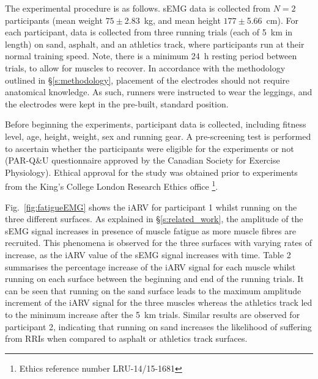 \documentclass[letterpaper, 10 pt, conference]{ieeeconf}
\newcommand{\fref}[1]{Fig.~\ref{#1}}       \newcommand{\sref}[1]{\S\ref{#1}}          \newcommand{\tref}[1]{\tablename~\ref{#1}} \newcommand{\eref}[1]{(\ref{#1})}
\begin{document}
The experimental procedure is as follows. sEMG data is collected from $N=2$
participants (mean weight $75\pm$\SI{2.83}{\kilo\gram}, and mean height
$177\pm$\SI{5.66}{\centi\meter}).  For each participant, data is collected from
three running trials (each of \SI{5}{\kilo\meter} in length) on sand, asphalt,
and an athletics track, where participants run at their normal training speed.
Note, there is a minimum \SI{24}{\hour} resting period between trials, to allow
for muscles to recover.  In accordance with the methodology outlined in
\sref{s:methodology}, placement of the electrodes should not require anatomical
knowledge. As such, runners were instructed to wear the leggings, and the
electrodes were kept in the pre-built, standard position. 

Before beginning the experiments, participant data is collected, including
fitness level, age, height, weight, sex and running gear. A pre-screening test
is performed to ascertain whether the participants were eligible for the
experiments or not (PAR-Q\&U questionnaire approved by the Canadian Society for
Exercise Physiology). Ethical approval for the study was obtained prior to
experiments from the King's College London Research Ethics office \footnote{Ethics reference number LRU-14/15-1681}.





\fref{fig:fatigueEMG} shows the iARV for participant 1 whilst running on the
three different surfaces. As explained in \sref{s:related_work}, the amplitude
of the sEMG signal increases in presence of muscle fatigue as more muscle
fibres are recruited. This phenomena is observed for the three surfaces with
varying rates of increase, as the iARV value of the sEMG signal increases with
time. Table 2 summarises the  percentage increase of the iARV signal for each
muscle whilst running on each surface between the beginning and end of the
running trials. It can be seen that running on the sand surface leads to the
maximum amplitude increment of the iARV signal for the three muscles whereas
the athletics track led to the minimum increase after the \SI{5}{\kilo\meter}
trials. Similar results are observed for participant 2, indicating that running
on sand increases the likelihood of suffering from RRIs when compared to
asphalt or athletics track surfaces. 
\end{document}
